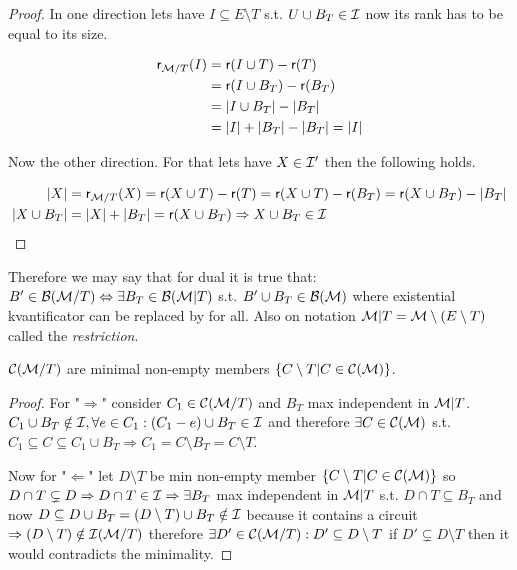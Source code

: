 \begin{proof}
	In one direction lets have $I \subseteq E \setminus T$ s.t. $U \cup B_T \in \mathcal{I}$ now its rank has to be equal to its size.
	
	$$
	\begin{aligned}
		\operatorname{\textsf{r}}_{\mathcal{M} / T} (I) &= \operatorname{\textsf{r}} (I \cup T) - \operatorname{\textsf{r}}(T)\\
		&= \operatorname{\textsf{r}}(I \cup B_T) - \operatorname{\textsf{r}}(B_T)\\
		&=|I \cup B_T| - |B_T|\\
		&= |I| + |B_T| - |B_T| = |I|
	\end{aligned}
	$$
	
	Now the other direction. For that lets have $X \in \mathcal{I}'$ then the following holds.
	
	$$
	\begin{aligned}
		|X| &= \operatorname{\textsf{r}}_{\mathcal{M} / T}(X) = \operatorname{\textsf{r}}(X \cup T) - \operatorname{\textsf{r}}(T) = \operatorname{\textsf{r}}(X \cup T) - \operatorname{\textsf{r}}(B_T) = \operatorname{\textsf{r}}(X \cup B_T) - |B_T|\\
		|X \cup B_T| &= |X| + |B_T| = \operatorname{\textsf{r}}(X \cup B_T) \Rightarrow X \cup B_T \in \mathcal{I}
	\end{aligned}
	$$
\end{proof}

Therefore we may say that for dual it is true that: $B' \in \mathcal{B}(\mathcal{M} /T) \Leftrightarrow \exists B_T \in \mathcal{B}(\mathcal{M} | T)$ s.t. $B' \cup B_T \in \mathcal{B}(\mathcal{M})$ where existential kvantificator can be replaced by for all. Also on notation $\mathcal{M} | T =  \mathcal{M} \setminus (E \setminus T)$ called the \textit{restriction}.

\begin{prop}
	$\mathcal{C} (\mathcal{M} /T)$ are minimal non-empty members $\{C \setminus T| C \in \mathcal{C}(\mathcal{M})\}$.
\end{prop}

\begin{proof}
	For "$\Rightarrow$" consider $C_1 \in \mathcal{C}(\mathcal{M} / T)$ and $B_T$ max independent in $\mathcal{M} | T$. $C_1 \cup B_T \notin \mathcal{I}, \forall e \in C_1 : (C_1 - e) \cup B_T \in \mathcal{I}$ and therefore $\exists C \in \mathcal{C}(\mathcal{M})$ s.t. $C_1 \subseteq C \subseteq C_1 \cup B_T \Rightarrow C_1 = C \setminus B_T = C \setminus T$.
	
	Now for "$\Leftarrow$" let $D \setminus T$ be min non-empty member $\{C \setminus T | C \in \mathcal{C}(\mathcal{M})\}$ so $D \cap T \subsetneq D \Rightarrow D \cap T \in \mathcal{I} \Rightarrow \exists B_T$ max independent in $\mathcal{M} |T$ s.t. $D \cap T \subseteq B_T$ and now $D \subseteq D \cup B_T = (D \setminus T) \cup B_T \notin \mathcal{I}$ because it contains a circuit $\Rightarrow (D \setminus T) \notin \mathcal{I}(\mathcal{M} / T)$ therefore $\exists D' \in \mathcal{C} (\mathcal{M} / T) : D' \subseteq D \setminus T$ if $D' \subsetneq D \setminus T$ then it would contradicts the minimality.
\end{proof}

